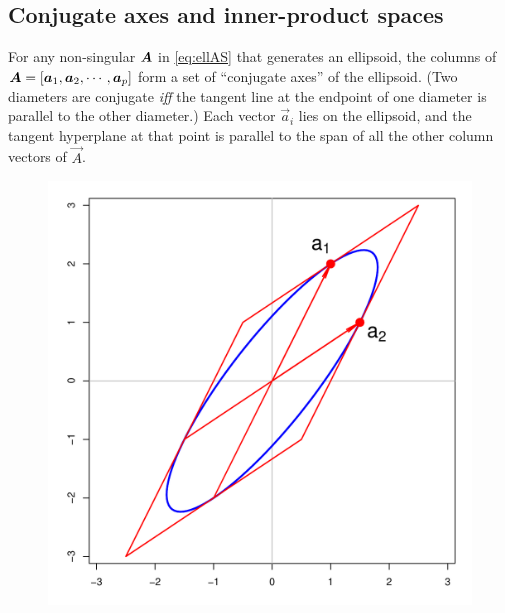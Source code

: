 \subsection{Conjugate axes and inner-product spaces}\label{sec:conjugate}

For any non-singular $\bm{A}$ in \eqref{eq:ellAS} that generates an ellipsoid,  %
the columns of
$\bm{A}=\left[
   \bm{a}_{1}, \bm{a}_{2}, \cdots, \bm{a}_{p}  \\
\right]
$
form a set of ``conjugate axes'' of the ellipsoid. (Two diameters are conjugate \emph{iff}
the tangent line at the endpoint of one diameter is parallel to the other diameter.)
Each vector
$\vec{a}_{i}$
lies on the ellipsoid, and the tangent hyperplane at that point is parallel to the span of all the other column vectors of
$\vec{A}$.
\begin{figure}[htb]
 \begin{minipage}[b]{.49\linewidth}
  \centering
  \includegraphics[width=1\linewidth]{fig/conjugate1}
 \end{minipage}%
 \hfill
 \begin{minipage}[b]{.49\linewidth}
  \centering

\end{minipage}
\end{figure}
